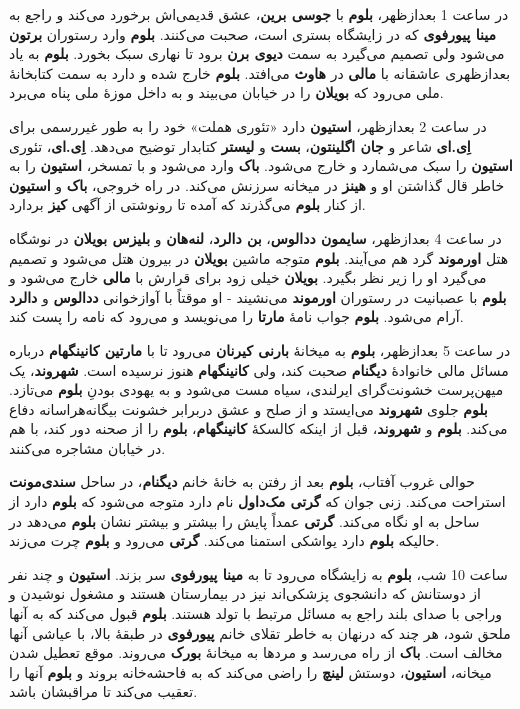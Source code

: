 \documentclass[12pt]{book}
\newcommand{\noun}[1]{{\textbf{#1}}}
\begin{document}
    در ساعت 1 بعدازظهر، \noun{بلوم} با \noun{جوسی برین}، عشق قدیمی‌اش برخورد می‌کند و راجع به \noun{مینا پیورفوی} که در زایشگاه بستری است، صحبت می‌کنند. \noun{بلوم} وارد رستوران \noun{برتون} می‌شود ولی تصمیم می‌گیرد به سمت \noun{دیوی برن} برود تا نهاری سبک بخورد. \noun{بلوم} به یاد بعدازظهری عاشقانه با \noun{مالی} در \noun{هاوث} می‌افتد. \noun{بلوم} خارج شده و دارد به سمت کتابخانهٔ ملی می‌رود که \noun{بویلان} را در خیابان می‌بیند و به داخل موزهٔ ملی پناه می‌برد.

    در ساعت 2 بعدازظهر، \noun{استیون} دارد «تئوری هملت» خود را به طور غیررسمی برای \noun{اِی.ای} شاعر و \noun{جان اگلینتون}، \noun{بست} و \noun{لیستر} کتابدار توضیح می‌دهد. \noun{اِی.ای}، تئوری \noun{استیون} را سبک می‌شمارد و خارج می‌شود. \noun{باک} وارد می‌شود و با تمسخر، \noun{استیون} را به خاطر قال گذاشتن او و \noun{هینز} در میخانه سرزنش می‌کند. در راه خروجی، \noun{باک} و \noun{استیون} از کنار \noun{بلوم} می‌گذرند که آمده تا رونوشتی از آگهی \noun{کیز} بردارد.

    در ساعت 4 بعدازظهر، \noun{سایمون ددالوس}، \noun{بن دالرد}، \noun{لنه‌هان} و \noun{بلیزس بویلان} در نوشگاه هتل \noun{اورموند} گرد هم می‌آیند. \noun{بلوم} متوجه ماشین \noun{بویلان} در بیرون هتل می‌شود و تصمیم می‌گیرد او را زیر نظر بگیرد. \noun{بویلان} خیلی زود برای قرارش با \noun{مالی} خارج می‌شود و \noun{بلوم} با عصبانیت در رستوران \noun{اورموند} می‌نشیند - او موقتاً با آوازخوانی \noun{ددالوس} و \noun{دالرد} آرام می‌شود. \noun{بلوم} جواب نامهٔ \noun{مارتا} را می‌نویسد و می‌رود که نامه را پست کند.

    در ساعت 5 بعدازظهر، \noun{بلوم} به میخانهٔ \noun{بارنی کیرنان} می‌رود تا با \noun{مارتین کانینگهام} درباره مسائل مالی خانوادهٔ \noun{دیگنام} صحبت کند، ولی \noun{کانینگهام} هنوز نرسیده است. \noun{شهروند}، یک میهن‌پرست خشونت‌گرای ایرلندی، سیاه مست می‌شود و به یهودی بودنِ \noun{بلوم} می‌تازد. \noun{بلوم} جلوی \noun{شهروند} می‌ایستد و از صلح و عشق دربرابر خشونت بیگانه‌هراسانه دفاع می‌کند. \noun{بلوم} و \noun{شهروند}، قبل از اینکه کالسکهٔ \noun{کانینگهام}، \noun{بلوم} را از صحنه دور کند، با هم در خیابان مشاجره می‌کنند.

    حوالی غروب آفتاب، \noun{بلوم} بعد از رفتن به خانهٔ خانم \noun{دیگنام}، در ساحل \noun{سندی‌مونت} استراحت می‌کند. زنی جوان که \noun{گرتی مک‌داول} نام دارد متوجه می‌شود که \noun{بلوم} دارد از ساحل به او نگاه می‌کند. \noun{گرتی} عمداً پایش را بیشتر و بیشتر نشان \noun{بلوم} می‌دهد در حالیکه \noun{بلوم} دارد یواشکی استمنا می‌کند. \noun{گرتی} می‌رود و \noun{بلوم} چرت می‌زند.

    ساعت 10 شب، \noun{بلوم} به زایشگاه می‌رود تا به \noun{مینا پیورفوی} سر بزند. \noun{استیون} و چند نفر از دوستانش که دانشجوی پزشکی‌اند نیز در بیمارستان هستند و مشغول نوشیدن و وراجی با صدای بلند راجع به مسائل مرتبط با تولد هستند. \noun{بلوم} قبول می‌کند که به آنها ملحق شود، هر چند که درنهان به خاطر تقلای خانم \noun{پیورفوی} در طبقهٔ بالا، با عیاشی آنها مخالف است. \noun{باک} از راه می‌رسد و مردها به میخانهٔ \noun{بورک} می‌روند. موقع تعطیل شدن میخانه، \noun{استیون}، دوستش \noun{لینچ} را راضی می‌کند که به فاحشه‌خانه بروند و \noun{بلوم} آنها را تعقیب می‌کند تا مراقبشان باشد.
\end{document}
